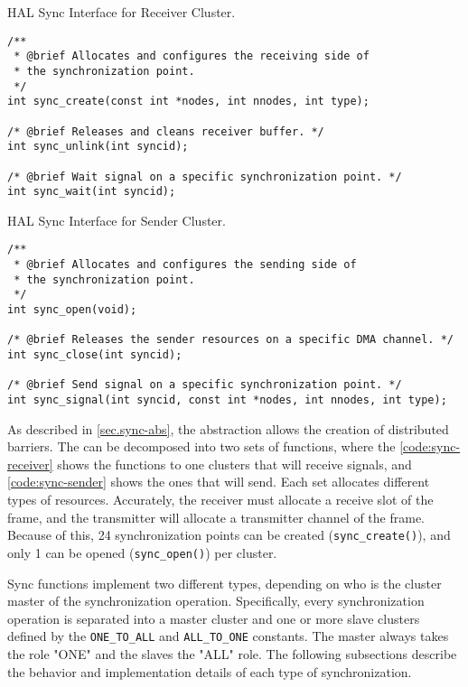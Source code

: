 \begin{listing}[!tb]
\caption{HAL Sync Interface for Receiver Cluster.}
\label{code:sync-receiver}
\begin{verbatim}
/**
 * @brief Allocates and configures the receiving side of
 * the synchronization point.
 */
int sync_create(const int *nodes, int nnodes, int type);

/* @brief Releases and cleans receiver buffer. */
int sync_unlink(int syncid);

/* @brief Wait signal on a specific synchronization point. */
int sync_wait(int syncid);
\end{verbatim}
\end{listing}

\begin{listing}[!tb]
\caption{HAL Sync Interface for Sender Cluster.}
\label{code:sync-sender}
\begin{verbatim}
/**
 * @brief Allocates and configures the sending side of
 * the synchronization point.
 */
int sync_open(void);

/* @brief Releases the sender resources on a specific DMA channel. */
int sync_close(int syncid);

/* @brief Send signal on a specific synchronization point. */
int sync_signal(int syncid, const int *nodes, int nnodes, int type);
\end{verbatim}
\end{listing}

				As described in \autoref{sec.sync-abs}, the \sync abstraction allows the
				creation of distributed barriers.
				The \sync can be decomposed into two sets of functions, where the
				\autoref{code:sync-receiver} shows the functions to one clusters
				that will receive signals, and \autoref{code:sync-sender} shows the
				ones that will send.
				Each set allocates different types of resources.
				Accurately, the receiver must allocate a receive slot of the frame,
				and the transmitter will allocate a transmitter channel of the frame.
				Because of this, 24 synchronization points can be created (\texttt{sync\_create()}),
				and only 1 can be opened (\texttt{sync\_open()}) per cluster.

				Sync functions implement two different types, depending on who is the
				cluster master of the synchronization operation.
				Specifically, every synchronization operation is separated into a
				master cluster and one or more slave clusters defined by the
				\texttt{ONE\_TO\_ALL} and \texttt{ALL\_TO\_ONE} constants.
				The master always takes the role "ONE" and the slaves the "ALL" role.
				The following subsections describe the behavior and implementation
				details of each type of synchronization.

